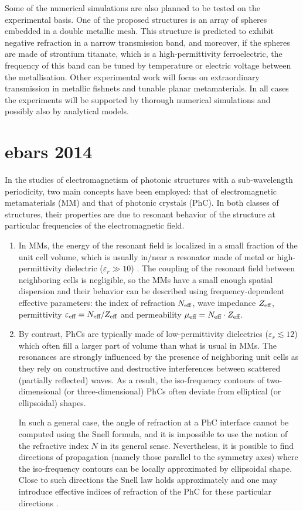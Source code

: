\documentclass[letterpaper,12pt]{report}
\begin{document}
Some of the numerical simulations are also planned to be tested on the experimental basis. One of the proposed structures is an array of spheres embedded in a double metallic mesh. This structure is predicted to exhibit negative refraction in a narrow transmission band, and moreover, if the spheres are made of strontium titanate, which is a high-permittivity ferroelectric, the frequency of this band can be tuned by temperature or electric voltage between the metallisation. Other experimental work will focus on extraordinary transmission in metallic fishnets and tunable planar metamaterials. In all cases the experiments will be supported by thorough numerical simulations and possibly also by analytical models.

\chapter{ebars 2014}
In the studies of electromagnetism of photonic structures with a sub-wavelength
periodicity, two main concepts have been employed: that of electromagnetic metamaterials
(MM) and that of photonic crystals (PhC). In both classes of structures, their properties
are due to resonant behavior of the structure at particular frequencies of the
electromagnetic field.
\begin{enumerate}
\item {
In MMs, the energy of the resonant field is localized in a small fraction of the unit
cell volume, which is usually in/near a resonator made of metal or high-permittivity
dielectric ($\varepsilon_r \gg 10$) \cite{vendik2012tunable}. 
The coupling of the resonant field between
neighboring cells is negligible, so the MMs have a small enough spatial dispersion and
their behavior can be described using frequency-dependent effective parameters: the index
of refraction $N_{\text{eff} }$, wave impedance $Z_{\text{eff} }$, permittivity $\varepsilon_{\text{eff} }=N_{\text{eff} }/Z_{\text{eff} }$ and
permeability $\mu_{\text{eff} } = N_{\text{eff} }\cdot Z_{\text{eff} }$.
}
\item{
By contrast, PhCs are typically made of low-permittivity dielectrics ($\varepsilon_r
\lesssim 12$) which often fill a larger part of volume than what is usual in MMs. The
resonances are strongly influenced by the presence of neighboring unit cells as they rely
on constructive and destructive interferences between scattered (partially reflected)
waves. As a result, the iso-frequency contours of two-dimensional (or three-dimensional)
PhCs often deviate from elliptical (or ellipsoidal) shapes.

In such a general case, the angle of refraction at a PhC interface cannot be computed
using the Snell formula, and it is impossible to use the notion of the
refractive index $N$ in its general sense. Nevertheless, it is possible to find directions of
propagation (namely those parallel to the symmetry axes) where the iso-frequency contours
can be locally approximated by ellipsoidal shape. Close to such directions the
Snell law holds approximately and one may introduce effective indices of
refraction of the PhC for these particular directions \cite{yannopapas2005negative}.
}
\end{enumerate}
\end{document}
